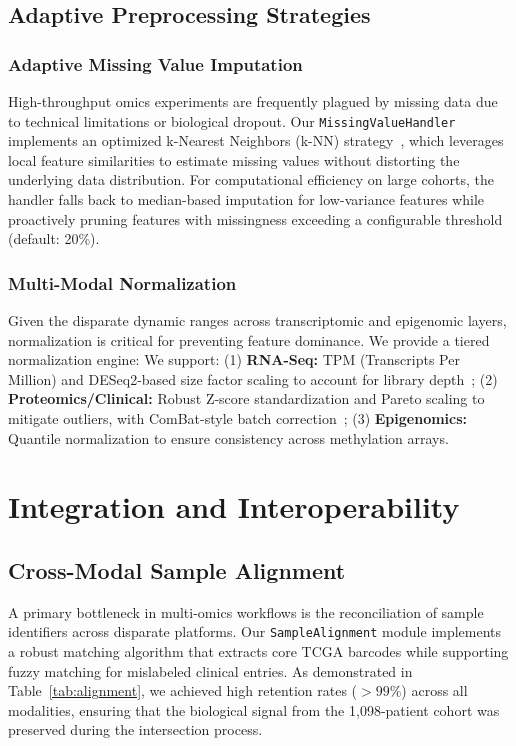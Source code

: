 \documentclass[conference,flushend]{iaria} %
\begin{document}
\subsection{Adaptive Preprocessing Strategies}

\subsubsection{Adaptive Missing Value Imputation}
High-throughput omics experiments are frequently plagued by missing data due to technical limitations or biological dropout. Our \texttt{MissingValueHandler} implements an optimized k-Nearest Neighbors (k-NN) strategy~\cite{troyanskaya2001}, which leverages local feature similarities to estimate missing values without distorting the underlying data distribution. For computational efficiency on large cohorts, the handler falls back to median-based imputation for low-variance features while proactively pruning features with missingness exceeding a configurable threshold (default: 20\%).

\subsubsection{Multi-Modal Normalization}
Given the disparate dynamic ranges across transcriptomic and epigenomic layers, normalization is critical for preventing feature dominance. We provide a tiered normalization engine:
We support: (1) \textbf{RNA-Seq:} TPM (Transcripts Per Million) and DESeq2-based size factor scaling to account for library depth~\cite{ritchie2015}; (2) \textbf{Proteomics/Clinical:} Robust Z-score standardization and Pareto scaling to mitigate outliers, with ComBat-style batch correction~\cite{johnson2007}; (3) \textbf{Epigenomics:} Quantile normalization to ensure consistency across methylation arrays.

\section{Integration and Interoperability}\label{sec:integration}

\subsection{Cross-Modal Sample Alignment}
A primary bottleneck in multi-omics workflows is the reconciliation of sample identifiers across disparate platforms. Our \texttt{SampleAlignment} module implements a robust matching algorithm that extracts core TCGA barcodes while supporting fuzzy matching for mislabeled clinical entries. As demonstrated in Table~\ref{tab:alignment}, we achieved high retention rates ($>99\%$) across all modalities, ensuring that the biological signal from the 1,098-patient cohort was preserved during the intersection process.
\end{document}
